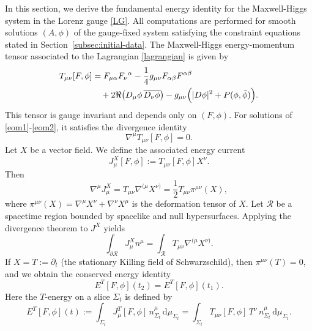 \documentclass[11pt]{article}
\numberwithin{equation}{section}
\theoremstyle{plain}
\theoremstyle{definition}
\theoremstyle{remark}
\newcommand{\dd}{\mathrm{d}}
\begin{document}
In this section, we derive the fundamental energy identity for the
Maxwell-Higgs system in the Lorenz gauge \eqref{LG}. All computations are performed for smooth solutions
$(A,\phi)$ of the gauge-fixed system satisfying the constraint
equations stated in Section~\ref{subsec:initial-data}. The Maxwell-Higgs energy-momentum tensor associated to the Lagrangian
\eqref{lagrangian} is given by
\begin{eqnarray}
T_{\mu\nu}[F,\phi]
&=
F_{\mu\alpha}F_{\nu}{}^{\alpha}
-\frac14 g_{\mu\nu}F_{\alpha\beta}F^{\alpha\beta}
\nonumber\\
&\quad
+2\Re\!\left(D_\mu\phi\,\overline{D_\nu\phi}\right)
-g_{\mu\nu}\Bigl(|D\phi|^2 + P(\phi,\bar\phi)\Bigr).
\end{eqnarray}
This tensor is gauge invariant and depends only on $(F,\phi)$.
For solutions of \eqref{eom1}-\eqref{eom2}, it satisfies the
divergence identity
\begin{equation}
\nabla^\mu T_{\mu\nu}[F,\phi]=0.
\end{equation}
Let $X$ be a vector field. We define the associated energy current
\begin{equation}
J_\mu^{X}[F,\phi] := T_{\mu\nu}[F,\phi] X^\nu.
\end{equation}
Then
\begin{equation}
\nabla^\mu J_\mu^{X}
=
T_{\mu\nu} \nabla^{(\mu} X^{\nu)}
=
\frac12 T_{\mu\nu} \pi^{\mu\nu}(X),
\end{equation}
where $\pi^{\mu\nu}(X)=\nabla^\mu X^\nu+\nabla^\nu X^\mu$
is the deformation tensor of $X$. Let $\mathcal{R}$ be a spacetime region bounded by spacelike and null hypersurfaces.
Applying the divergence theorem to $J^X$ yields
\begin{equation}\label{eq:divergence-theorem-JX}
\int_{\partial\mathcal{R}} J_\mu^{X} n^\mu
=
\int_{\mathcal{R}} T_{\mu\nu}\nabla^{(\mu}X^{\nu)}.
\end{equation}
If $X=T:=\partial_t$ (the stationary Killing field of Schwarzschild),
then $\pi^{\mu\nu}(T)=0$, and we obtain the conserved energy identity
\begin{equation}\label{Eidentity}
E^{T}[F,\phi](t_{2})=E^{T}[F,\phi](t_{1}).
\end{equation}
Here the $T$-energy on a slice $\Sigma_t$ is defined by
\begin{equation}\label{energytimelike}
E^{T}[F,\phi](t)
:=
\int_{\Sigma_t} J_\mu^{T}[F,\phi]\,n_{\Sigma_t}^\mu\,\dd\mu_{\Sigma_t}
=
\int_{\Sigma_t}T_{\mu\nu}[F,\phi]\,T^\nu\,n_{\Sigma_t}^\mu\,\dd\mu_{\Sigma_t}.
\end{equation}
\end{document}
